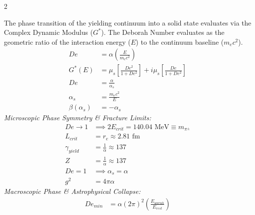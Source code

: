 \begin{multicols}{2}
\begin{tcolorbox}[cheatbox, title={\refstepcounter{cheatnum}\label{box:unified_deborah}\thecheatnum. The Cosmological Deborah Number \hfill\scriptsize\hyperref[sec:deriv_unified_deborah]{[Proof $\downarrow$]}}]
The phase transition of the yielding continuum into a solid state evaluates via the Complex Dynamic Modulus ($G^*$). The Deborah Number evaluates as the geometric ratio of the interaction energy ($E$) to the continuum baseline ($m_e c^2$). %
\begin{align}
    De &= \alpha \left( \frac{E}{m_e c^2} \right) \label{eq:unified_deborah} \\
    G^*(E) &= \mu_s \left[ \frac{De^2}{1 + De^2} \right] + i \mu_s \left[ \frac{De}{1 + De^2} \right] \label{eq:deborah_modulus} \\
    De &= \frac{\alpha}{\alpha_s} \label{eq:de_ratio} \\
    \alpha_s &= \frac{m_e c^2}{E} \label{eq:angular_distribution} \\
    \beta(\alpha_s) &= - \alpha_s \label{eq:beta_function} %
\end{align}
\textit{Microscopic Phase Symmetry \& Fracture Limits:} %
\begin{align}
    De \to 1 &\implies 2 E_{crit} = 140.04 \text{ MeV} \equiv m_{\pi^{\pm}} \label{eq:de_glass} \\
    L_{crit} &= r_e \approx 2.81 \text{ fm} \label{eq:de_range} \\ %
    \gamma_{yield} &= \frac{1}{\alpha} \approx 137 \label{eq:gamma_yield} \\
    Z &= \frac{1}{\alpha} \approx 137 \label{eq:atomic_phase_limit} \\
    De = 1 &\implies \alpha_s = \alpha \label{eq:electro_strong_symmetry} \\
    g^2 &= 4\pi\alpha \label{eq:strong_charge_symmetry} %
\end{align}
\textit{Macroscopic Phase \& Astrophysical Collapse:} %
\begin{align}
    De_{min} &= \alpha (2\pi)^2 \left( \frac{E_{unruh}}{E_{rest}} \right) \label{eq:de_gravity} \\

\end{align}
\end{tcolorbox}
\end{multicols}
